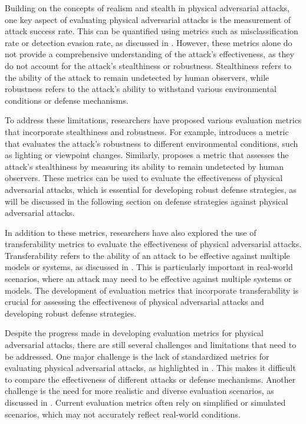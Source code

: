 \documentclass[11pt,a4paper]{article}
\begin{document}
Building on the concepts of realism and stealth in physical adversarial attacks, one key aspect of evaluating physical adversarial attacks is the measurement of attack success rate. This can be quantified using metrics such as misclassification rate or detection evasion rate, as discussed in \cite{arxiv:1707.08945}. However, these metrics alone do not provide a comprehensive understanding of the attack's effectiveness, as they do not account for the attack's stealthiness or robustness. Stealthiness refers to the ability of the attack to remain undetected by human observers, while robustness refers to the attack's ability to withstand various environmental conditions or defense mechanisms.

To address these limitations, researchers have proposed various evaluation metrics that incorporate stealthiness and robustness. For example, \cite{doi:10.1109/cvpr42600.2020.01426} introduces a metric that evaluates the attack's robustness to different environmental conditions, such as lighting or viewpoint changes. Similarly, \cite{arxiv:2203.03818} proposes a metric that assesses the attack's stealthiness by measuring its ability to remain undetected by human observers. These metrics can be used to evaluate the effectiveness of physical adversarial attacks, which is essential for developing robust defense strategies, as will be discussed in the following section on defense strategies against physical adversarial attacks.

In addition to these metrics, researchers have also explored the use of transferability metrics to evaluate the effectiveness of physical adversarial attacks. Transferability refers to the ability of an attack to be effective against multiple models or systems, as discussed in \cite{doi:10.24963/ijcai.2019/134}. This is particularly important in real-world scenarios, where an attack may need to be effective against multiple systems or models. The development of evaluation metrics that incorporate transferability is crucial for assessing the effectiveness of physical adversarial attacks and developing robust defense strategies.

Despite the progress made in developing evaluation metrics for physical adversarial attacks, there are still several challenges and limitations that need to be addressed. One major challenge is the lack of standardized metrics for evaluating physical adversarial attacks, as highlighted in \cite{arxiv:1902.06705}. This makes it difficult to compare the effectiveness of different attacks or defense mechanisms. Another challenge is the need for more realistic and diverse evaluation scenarios, as discussed in \cite{doi:10.1007/s13042-021-01435-0}. Current evaluation metrics often rely on simplified or simulated scenarios, which may not accurately reflect real-world conditions.
\end{document}
